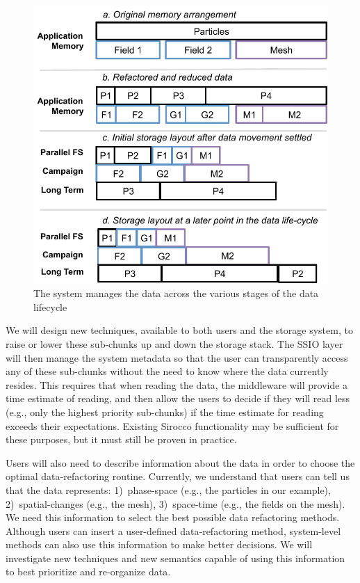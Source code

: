 \begin{figure}
        \vspace{-2ex}
        \begin{centering} 
	\includegraphics[scale=0.8]{graphics/SSIO-bucket.pdf}
        \caption{The system manages the data across the various stages of the data lifecycle}
        \label{fig:ssio-bucket}
        \end{centering}
       \vspace{-1ex}
\end{figure}


We will design new techniques, available to both users and the storage system,
to raise or lower these sub-chunks up and
down the storage stack. The SSIO layer will then manage the system metadata so
that the user can transparently access any of these sub-chunks without
the need to know where the data currently resides.
This requires that when reading the data, the middleware will
provide a time estimate of reading, and then allow the users to decide if
they will read less (e.g., only the highest priority sub-chunks)
if the time estimate
for reading exceeds their expectations. Existing Sirocco functionality may be
sufficient for these purposes, but it must still be proven in practice.
%

Users will also need to describe information about the data in order to choose
the optimal data-refactoring routine. Currently, we understand that
users can tell us that the data represents: 1)~phase-space (e.g., the particles
in our example), 2)~spatial-changes (e.g., the mesh), 3)~space-time (e.g.,
the fields on the mesh). We need this information to select
the best possible data
refactoring methods. Although users can insert a user-defined data-refactoring
method, system-level methods can also use this information to make better decisions.
We will investigate new techniques and new semantics capable of using
this information to best prioritize and re-organize data.

